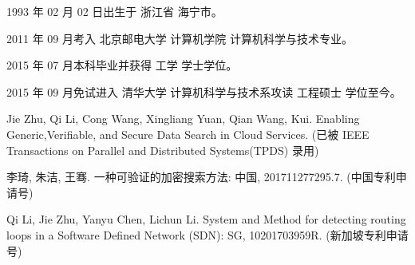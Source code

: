 \begin{resume}


  1993 年 02 月 02 日出生于 浙江省 海宁市。

  2011 年 09 月考入 北京邮电大学 计算机学院 计算机科学与技术专业。

  2015 年 07 月本科毕业并获得 工学 学士学位。

  2015 年 09 月免试进入 清华大学 计算机科学与技术系攻读 工程硕士 学位至今。



  \begin{publications}[before=\publicationskip,after=\publicationskip]
    \item Jie Zhu, Qi Li, Cong Wang, Xingliang Yuan, Qian Wang, Kui. Enabling Generic,Verifiable, and Secure Data Search in Cloud Services. (已被 IEEE Transactions on Parallel and Distributed Systems(TPDS) 录用)
  \end{publications}


  \begin{achievements}
    \item 李琦, 朱洁, 王骞. 一种可验证的加密搜索方法: 中国, 201711277295.7. (中国专利申请号)
    \item Qi Li, Jie Zhu, Yanyu Chen, Lichun Li. System and Method for detecting routing loops in a Software Defined Network (SDN): SG, 10201703959R. (新加坡专利申请号)
  \end{achievements}

\end{resume}
